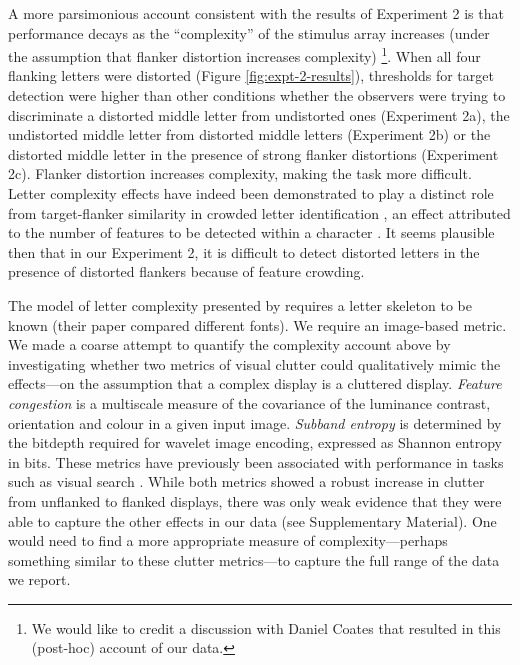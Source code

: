 \documentclass[doc, 11pt,a4paper,natbib]{apa6}\usepackage[]{graphicx}\usepackage[]{color}
\begin{document}
A more parsimonious account consistent with the results of Experiment 2 is that performance decays as the ``complexity'' of the stimulus array increases (under the assumption that flanker distortion increases complexity)
\footnote{We would like to credit a discussion with Daniel Coates that resulted in this (post-hoc) account of our data.}.
When all four flanking letters were distorted (Figure \ref{fig:expt-2-results}), thresholds for target detection were higher than other conditions whether the observers were trying to discriminate a distorted middle letter from undistorted ones (Experiment 2a), the undistorted middle letter from distorted middle letters (Experiment 2b) or the distorted middle letter in the presence of strong flanker distortions (Experiment 2c).
Flanker distortion increases complexity, making the task more difficult.
Letter complexity effects have indeed been demonstrated to play a distinct role from target-flanker similarity in crowded letter identification \citep{bernard_dependence_2011}, an effect attributed to the number of features to be detected within a character \citep[see also][]{pelli_feature_2006, suchow_learning_2012}.
It seems plausible then that in our Experiment 2, it is difficult to detect distorted letters in the presence of distorted flankers because of feature crowding.

The model of letter complexity presented by \citet{bernard_dependence_2011} requires a letter skeleton to be known (their paper compared different fonts).
We require an image-based metric.
We made a coarse attempt to quantify the complexity account above by investigating whether two metrics of visual clutter \citep{rosenholtz_measuring_2007} could qualitatively mimic the effects---on the assumption that a complex display is a cluttered display.
\textit{Feature congestion} is a multiscale measure of the covariance of the luminance contrast, orientation and colour in a given input image.
\textit{Subband entropy} is determined by the bitdepth required for wavelet image encoding, expressed as Shannon entropy in bits.
These metrics have previously been associated with performance in tasks such as visual search \citep{asher_regional_2013, henderson_influence_2009, rosenholtz_measuring_2007}.
While both metrics showed a robust increase in clutter from unflanked to flanked displays, there was only weak evidence that they were able to capture the other effects in our data (see Supplementary Material).
One would need to find a more appropriate measure of complexity---perhaps something similar to these clutter metrics---to capture the full range of the data we report.
\end{document}
